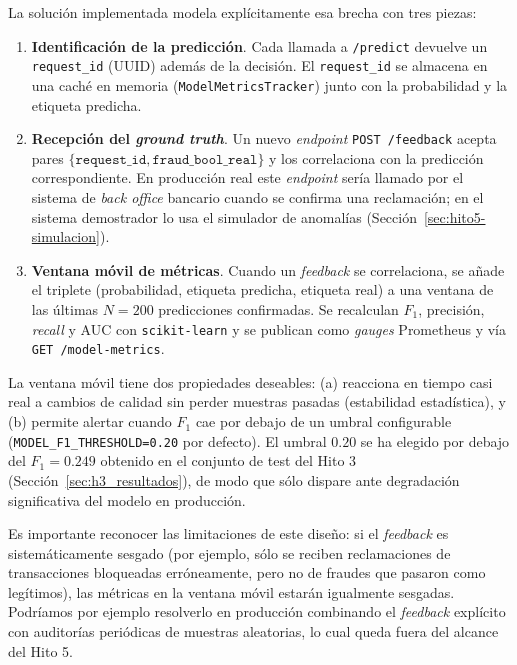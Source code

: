 \documentclass[12pt,a4paper]{report}
\begin{document}
La solución implementada modela explícitamente esa brecha con tres piezas:

\begin{enumerate}
    \item \textbf{Identificación de la predicción}. Cada llamada a \texttt{/predict} devuelve un \texttt{request\_id} (UUID) además de la decisión. El \texttt{request\_id} se almacena en una caché en memoria (\texttt{ModelMetricsTracker}) junto con la probabilidad y la etiqueta predicha.
    \item \textbf{Recepción del \textit{ground truth}}. Un nuevo \textit{endpoint} \texttt{POST /feedback} acepta pares $\{\texttt{request\_id}, \texttt{fraud\_bool\_real}\}$ y los correlaciona con la predicción correspondiente. En producción real este \textit{endpoint} sería llamado por el sistema de \textit{back office} bancario cuando se confirma una reclamación; en el sistema demostrador lo usa el simulador de anomalías (Sección~\ref{sec:hito5-simulacion}).
    \item \textbf{Ventana móvil de métricas}. Cuando un \textit{feedback} se correlaciona, se añade el triplete (probabilidad, etiqueta predicha, etiqueta real) a una ventana de las últimas $N=200$ predicciones confirmadas. Se recalculan $F_1$, precisión, \textit{recall} y AUC con \texttt{scikit-learn} y se publican como \textit{gauges} Prometheus y vía \texttt{GET /model-metrics}.
\end{enumerate}

La ventana móvil tiene dos propiedades deseables: (a) reacciona en tiempo casi real a cambios de calidad sin perder muestras pasadas (estabilidad estadística), y (b) permite alertar cuando $F_1$ cae por debajo de un umbral configurable (\texttt{MODEL\_F1\_THRESHOLD=0.20} por defecto). El umbral $0.20$ se ha elegido por debajo del $F_1=0.249$ obtenido en el conjunto de test del Hito 3 (Sección~\ref{sec:h3_resultados}), de modo que sólo dispare ante degradación significativa del modelo en producción.

Es importante reconocer las limitaciones de este diseño: si el \textit{feedback} es sistemáticamente sesgado (por ejemplo, sólo se reciben reclamaciones de transacciones bloqueadas erróneamente, pero no de fraudes que pasaron como legítimos), las métricas en la ventana móvil estarán igualmente sesgadas. Podríamos por ejemplo resolverlo en producción combinando el \textit{feedback} explícito con auditorías periódicas de muestras aleatorias, lo cual queda fuera del alcance del Hito 5.
\end{document}
